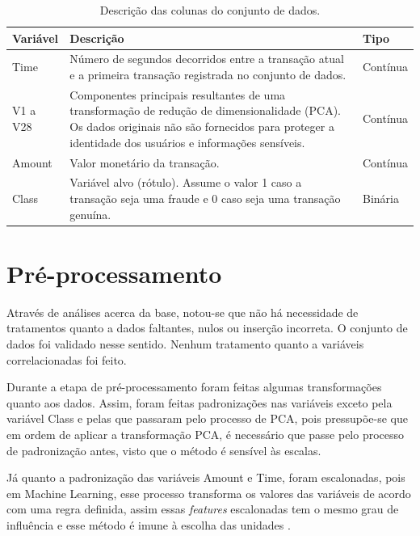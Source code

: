 \documentclass{uflamon}          %
\begin{document}
\begin{table}[htb]
    \centering
    \caption{Descrição das colunas do conjunto de dados.}
    \vspace{2mm}
    \begin{tabular}{L{2cm} L{10cm} C{2cm}}
        \toprule
        \textbf{Variável} & \textbf{Descrição} & \textbf{Tipo} \\
        \midrule
        Time & Número de segundos decorridos entre a transação atual e a primeira transação registrada no conjunto de dados. & Contínua \\
        \addlinespace
        V1 a V28 & Componentes principais resultantes de uma transformação de redução de dimensionalidade (PCA). Os dados originais não são fornecidos para proteger a identidade dos usuários e informações sensíveis. & Contínua \\
        \addlinespace
        Amount & Valor monetário da transação. & Contínua \\
        \addlinespace
        Class & Variável alvo (rótulo). Assume o valor 1 caso a transação seja uma fraude e 0 caso seja uma transação genuína. & Binária \\
        \bottomrule
    \end{tabular}
    \label{tab:descricao_colunas}
\end{table}

\section{Pré-processamento}

Através de análises acerca da base, notou-se que não há necessidade de tratamentos quanto a dados faltantes, nulos ou inserção incorreta. O conjunto de dados foi validado nesse sentido. Nenhum tratamento quanto a variáveis correlacionadas foi feito.

Durante a etapa de pré-processamento foram feitas algumas transformações quanto aos dados. Assim, foram feitas padronizações nas variáveis exceto pela variável Class e pelas que passaram pelo processo de PCA, pois pressupõe-se que em ordem de aplicar a transformação PCA, é necessário que passe pelo processo de padronização antes, visto que o método é sensível às escalas.

Já quanto a padronização das variáveis Amount e Time, foram escalonadas, pois em Machine Learning, esse processo transforma os valores das variáveis de acordo com uma regra definida, assim essas \textit{features} escalonadas tem o mesmo grau de influência e esse método é imune à escolha das unidades \cite{huang2015}.
\end{document}
